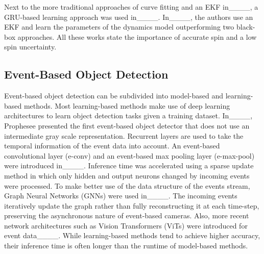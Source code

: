 Next to the more traditional approaches of curve fitting and an \ac{EKF} in____, a GRU-based learning approach was used in____.
%
In____, the authors use an \ac{EKF} and learn the parameters of the dynamics model outperforming two black-box approaches.
%
All these works state the importance of accurate spin and a low spin uncertainty.


%
%
%


\subsection{Event-Based Object Detection}\label{subsec:rel_ebod}

Event-based object detection can be subdivided into model-based and learning-based methods.
%
Most learning-based methods make use of deep learning architectures to learn object detection tasks given a training dataset.
%
In____, Prophesee presented the first event-based object detector that does not use an intermediate gray scale representation.
%
%
Recurrent layers are used to take the temporal information of the event data into account.
%
An event-based convolutional layer (e-conv) and an event-based max pooling layer (e-max-pool) were introduced in____.
%
Inference time was accelerated using a sparse update method in which only hidden and output neurons changed by incoming events were processed.
%
To make better use of the data structure of the events stream, Graph Neural Networks (GNNs) were used in____.
%
The incoming events iteratively update the graph rather than fully reconstructing it at each time-step, preserving the asynchronous nature of event-based cameras.
%
Also, more recent network architectures such as Vision Transformers (ViTs) were introduced for event data____.
%
While learning-based methods tend to achieve higher accuracy, their inference time is often longer than the runtime of model-based methods.

